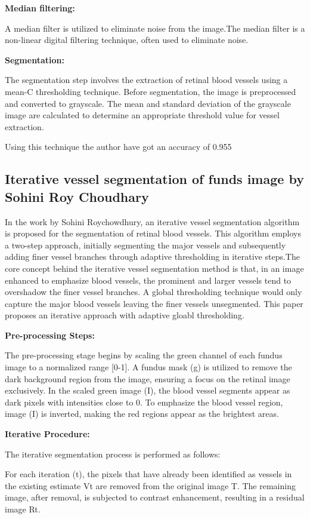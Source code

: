 \documentclass{article}
\begin{document}
\textbf{Median filtering:}

A median filter is utilized to eliminate noise from the image.The median filter is a non-linear digital filtering technique, often used to eliminate noise. 

\textbf{Segmentation:}

The segmentation step involves the extraction of retinal blood vessels using a mean-C thresholding technique.
Before segmentation, the image is preprocessed and converted to grayscale.
The mean and standard deviation of the grayscale image are calculated to determine an appropriate threshold value for vessel extraction.

Using this technique the author have got an accuracy of 0.955

\subsection{Iterative vessel segmentation of funds image by Sohini Roy Choudhary}

In the work by Sohini Roychowdhury, an iterative vessel segmentation algorithm is proposed for the segmentation of retinal blood vessels. This algorithm employs a two-step approach, initially segmenting the major vessels and subsequently adding finer vessel branches through adaptive thresholding in iterative steps.The core concept behind the iterative vessel segmentation method is that, in an image enhanced to emphasize blood vessels, the prominent and larger vessels tend to overshadow the finer vessel branches. A global thresholding technique would only capture the major blood vessels leaving the finer vessels unsegmented. This paper proposes an iterative approach with adaptive gloabl thresholding.

\textbf{Pre-processing Steps:}

The pre-processing stage begins by scaling the green channel of each fundus image to a normalized range [0-1]. A fundus mask (g) is utilized to remove the dark background region from the image, ensuring a focus on the retinal image exclusively. In the scaled green image (I), the blood vessel segments appear as dark pixels with intensities close to 0. To emphasize the blood vessel region, image (I) is inverted, making the red regions appear as the brightest areas.


\textbf{Iterative Procedure:}

The iterative segmentation process is performed as follows:

For each iteration (t), the pixels that have already been identified as vessels in the existing estimate Vt are removed from the original image T.
The remaining image, after removal, is subjected to contrast enhancement, resulting in a residual image Rt.
\end{document}
